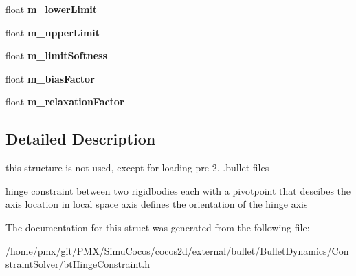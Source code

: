 \begin{DoxyCompactItemize}
float {\bfseries m\+\_\+lower\+Limit}
\item 
\mbox{\label{structbtHingeConstraintDoubleData_a231ef521e7d4848c5b9226ff50dbbd12}} 
float {\bfseries m\+\_\+upper\+Limit}
\item 
\mbox{\label{structbtHingeConstraintDoubleData_ad0ae0fdfdc31180fbeebf1d160c86b77}} 
float {\bfseries m\+\_\+limit\+Softness}
\item 
\mbox{\label{structbtHingeConstraintDoubleData_ac94487908f2a28df8be317ef588fb382}} 
float {\bfseries m\+\_\+bias\+Factor}
\item 
\mbox{\label{structbtHingeConstraintDoubleData_abdea05be210308a95a740b14f483e8c5}} 
float {\bfseries m\+\_\+relaxation\+Factor}
\end{DoxyCompactItemize}


\subsection{Detailed Description}
this structure is not used, except for loading pre-\/2. .bullet files 

hinge constraint between two rigidbodies each with a pivotpoint that descibes the axis location in local space axis defines the orientation of the hinge axis 

The documentation for this struct was generated from the following file\+:\begin{DoxyCompactItemize}
\item 
/home/pmx/git/\+P\+M\+X/\+Simu\+Cocos/cocos2d/external/bullet/\+Bullet\+Dynamics/\+Constraint\+Solver/bt\+Hinge\+Constraint.\+h\end{DoxyCompactItemize}
